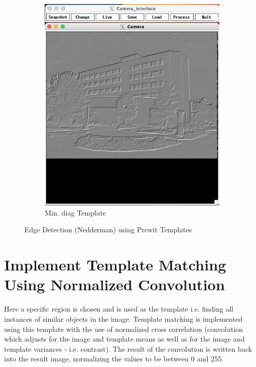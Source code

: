 \documentclass[12pt]{article}
\begin{document}
\begin{figure}
\begin{subfigure}[b]{0.475\textwidth}
		\includegraphics[width=\textwidth]{hw3_results/p1_nedd_mindiag}
		\caption[]%
		{{\small Min. diag Template}}    
		\label{fig:mean and std of net42}
	\end{subfigure}
	\caption[ ]
	{\small Edge Detection (Nedderman) using Prewit Templates} 
	\label{fig:edge_detect2}
\end{figure}


\section{Implement Template Matching Using Normalized Convolution}
Here a specific region is chosen and is used as the template i.e. finding all instances of similar objects in the image. Template matching is implemented using this template with the use of normalized cross correlation (convolution
which adjusts for the image and template means as well as for the image and template variances - i.e. contrast). The result of the convolution is written back into the result image, normalizing the values to be between 0 and 255. 
\end{document}

